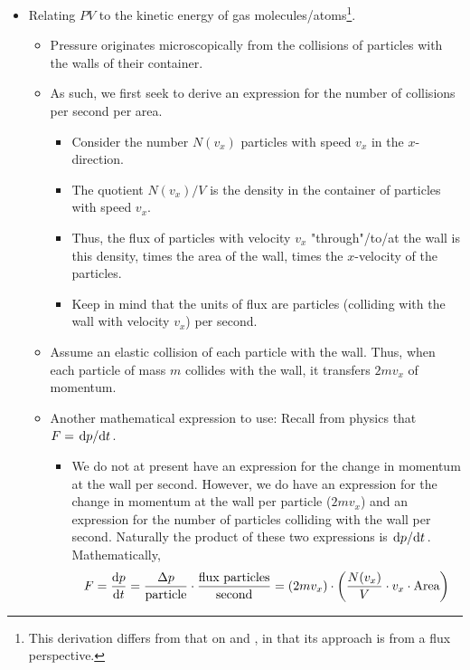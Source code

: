 \documentclass[../notes.tex]{subfiles}
\begin{document}
\begin{itemize}
\begin{itemize}
    \end{itemize}
    \item Relating $PV$ to the kinetic energy of gas molecules/atoms\footnote{This derivation differs from that on \textcite[3-4]{bib:APChemNotes} and \textcite[18-19]{bib:PHYS13300Notes}, in that its approach is from a flux perspective.}.
    \begin{itemize}
        \item Pressure originates microscopically from the collisions of particles with the walls of their container.
        \item As such, we first seek to derive an expression for the number of collisions per second per area.
        \begin{itemize}
            \item Consider the number $N(v_x)$ particles with speed $v_x$ in the $x$-direction.
            \item The quotient $N(v_x)/V$ is the density in the container of particles with speed $v_x$.
            \item Thus, the flux of particles with velocity $v_x$ "through"/to/at the wall is this density, times the area of the wall, times the $x$-velocity of the particles.
            \item Keep in mind that the units of flux are particles (colliding with the wall with velocity $v_x$) per second.
        \end{itemize}
        \item Assume an elastic collision of each particle with the wall. Thus, when each particle of mass $m$ collides with the wall, it transfers $2mv_x$ of momentum.
        \item Another mathematical expression to use: Recall from physics that $F=\dv*{p}{t}$.
        \begin{itemize}
            \item We do not at present have an expression for the change in momentum at the wall per second. However, we do have an expression for the change in momentum at the wall per particle ($2mv_x$) and an expression for the number of particles colliding with the wall per second. Naturally the product of these two expressions is $\dv*{p}{t}$. Mathematically,
            \begin{equation*}
                F = \dv{p}{t}
                = \frac{\Delta p}{\text{particle}}\cdot\frac{\text{flux particles}}{\text{second}}
                = (2mv_x)\cdot\left( \frac{N(v_x)}{V}\cdot v_x\cdot\text{Area} \right)
            \end{equation*}

\end{itemize}
\end{itemize}
\end{itemize}
\end{document}
